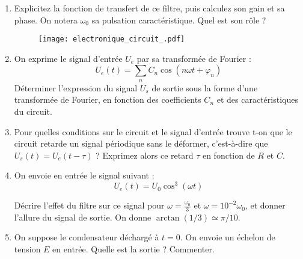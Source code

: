 \begin{enumerate}

\item Explicitez la fonction de transfert de ce filtre, puis calculez son gain et sa phase. On notera $\omega_0$ sa pulsation caractéristique. Quel est son rôle ?
\begin{figure}[!h]
\centering
\texttt{[image: electronique\_circuit\_.pdf]}
\end{figure}

\item On exprime le signal d'entrée $U_e$ par sa transformée de Fourier :
\begin{equation}
U_e(t) = \sum_n C_n\cos(n\omega t + \varphi_n)
\end{equation}
Déterminer l'expression du signal $U_s$ de sortie sous la forme d'une transformée de Fourier, en fonction des coefficients $C_n$ et des caractéristiques du circuit.

\item
Pour quelles conditions sur le circuit et le signal d'entrée trouve t-on que le circuit retarde un signal périodique sans le déformer, c'est-à-dire que $U_{s}(t)=U_{e}(t-\tau)$ ? Exprimez alors ce retard $\tau$ en fonction de $R$ et $C$.

\item On envoie en entrée le signal suivant :
\begin{equation}
U_{e}(t) = U_{0}\cos^{3}(\omega t)
\end{equation}

Décrire l'effet du filtre sur ce signal pour $\omega = \frac{\omega_{0}}{3}$ et $\omega=10^{-2}\omega_0$, et donner l'allure du signal de sortie. On donne $\arctan(1/3)\simeq\pi/10$.

\item
On suppose le condensateur déchargé à $t=0$. On envoie un échelon de tension $E$ en entrée. Quelle est la sortie ? Commenter.
\end{enumerate}

\newpage

